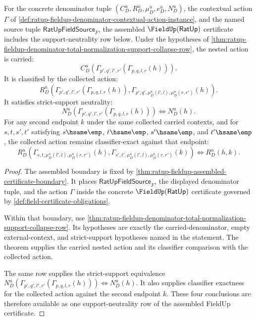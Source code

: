 \begin{theorem}
\label{thm:ratup-fieldup-assembled-support-neutrality-certificate}
For the concrete denominator tuple $(C_D^u,R_D^u,\mu_D^u,e_D^u,N_D^u)$, the
contextual action $\Gamma$ of
\autoref{def:ratup-fieldup-denominator-contextual-action-instance}, and the
named source tuple $\mathsf{RatUpFieldSource}_F$, the assembled
$\FieldUp(\mathsf{RatUp})$ certificate includes the support-neutrality row
below. Under the hypotheses of
\autoref{thm:ratup-fieldup-denominator-total-normalization-support-collapse-row},
the nested action is carried:
$$
C_D^u(\Gamma_{p',q',l',r'}(\Gamma_{p,q,l,r}(h))).
$$
It is classified by the collected action:
$$
R_D^u(\Gamma_{p',q',l',r'}(\Gamma_{p,q,l,r}(h)),
\Gamma_{p',q',\mu_D^u(l',l),\mu_D^u(r,r')}(h)).
$$
It satisfies strict-support neutrality:
$$
N_D^u(\Gamma_{p',q',l',r'}(\Gamma_{p,q,l,r}(h)))
\Longleftrightarrow
N_D^u(h).
$$
For any second endpoint $k$ under the same collected carried contexts, and for
$s,t,s',t'$ satisfying $s\hsame\emp$, $t\hsame\emp$, $s'\hsame\emp$, and
$t'\hsame\emp$, the collected action remains classifier-exact against that
endpoint:
$$
R_D^u(\Gamma_{s,t,\mu_D^u(l',l),\mu_D^u(r,r')}(h),
\Gamma_{s',t',\mu_D^u(l',l),\mu_D^u(r,r')}(k))
\Longleftrightarrow R_D^u(h,k).
$$
\end{theorem}
\begin{proof}
The assembled boundary is fixed by
\autoref{thm:ratup-fieldup-assembled-certificate-boundary}. It places
$\mathsf{RatUpFieldSource}_F$, the displayed denominator tuple, and the action
$\Gamma$ inside the concrete $\FieldUp(\mathsf{RatUp})$ certificate governed by
\autoref{def:field-certificate-obligations}.

Within that boundary, use
\autoref{thm:ratup-fieldup-denominator-total-normalization-support-collapse-row}.
Its hypotheses are exactly the carried-denominator, empty external-context, and
strict-support hypotheses named in the statement. The theorem supplies the
carried nested action and its classifier comparison with the collected action.

The same row supplies the strict-support equivalence
$N_D^u(\Gamma_{p',q',l',r'}(\Gamma_{p,q,l,r}(h)))\Longleftrightarrow N_D^u(h)$.
It also supplies classifier exactness for the collected action against the
second endpoint $k$. These four conclusions are therefore available as one
support-neutrality row of the assembled FieldUp certificate.
\end{proof}

